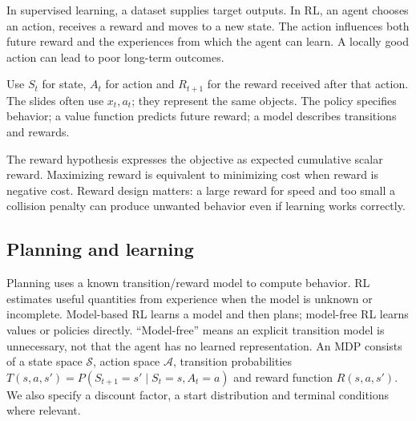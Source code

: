 \documentclass[11pt]{article}
\begin{document}
\tableofcontents\clearpage
{}
In supervised learning, a dataset supplies target outputs. In RL, an agent chooses an action, receives a reward and moves to a new state. The action influences both future reward and the experiences from which the agent can learn. A locally good action can lead to poor long-term outcomes.

Use $S_t$ for state, $A_t$ for action and $R_{t+1}$ for the reward received after that action. The slides often use $x_t,a_t$; they represent the same objects. The policy specifies behavior; a value function predicts future reward; a model describes transitions and rewards.
\begin{center}
\end{center}
The reward hypothesis expresses the objective as expected cumulative scalar reward. Maximizing reward is equivalent to minimizing cost when reward is negative cost. Reward design matters: a large reward for speed and too small a collision penalty can produce unwanted behavior even if learning works correctly.
\subsection{Planning and learning}
Planning uses a known transition/reward model to compute behavior. RL estimates useful quantities from experience when the model is unknown or incomplete. Model-based RL learns a model and then plans; model-free RL learns values or policies directly. ``Model-free'' means an explicit transition model is unnecessary, not that the agent has no learned representation.
An MDP consists of a state space $\mathcal S$, action space $\mathcal A$, transition probabilities $T(s,a,s')=P(S_{t+1}=s'\mid S_t=s,A_t=a)$ and reward function $R(s,a,s')$. We also specify a discount factor, a start distribution and terminal conditions where relevant.
\end{document}
